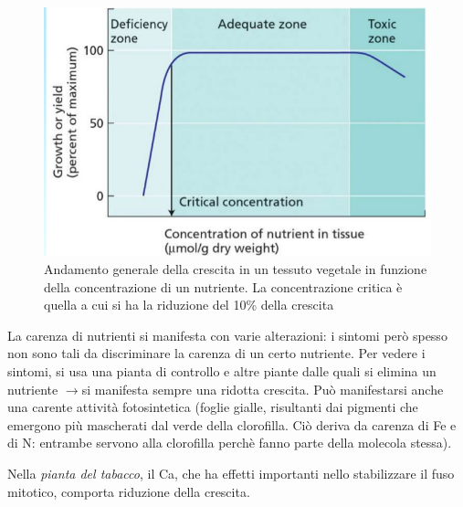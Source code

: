 \documentclass[a4paper,12pt]{book}
\newcommand{\lfreccia}{\ensuremath{\longrightarrow}}
\begin{document}
\begin{figure}[H]
\centering
\includegraphics[scale=0.3]{immagini/carenza.jpg}
\caption{Andamento generale della crescita in un tessuto vegetale in funzione della concentrazione di un nutriente. La
concentrazione critica è quella a cui si ha la riduzione del 10\% della crescita }
\end{figure}
La carenza di nutrienti si manifesta con varie alterazioni: i sintomi però spesso non sono tali da discriminare la carenza di un certo nutriente. Per vedere i sintomi, si usa una pianta di controllo e altre piante dalle quali si elimina un nutriente \lfreccia si manifesta sempre una ridotta crescita. Può manifestarsi anche una carente attività fotosintetica (foglie gialle, risultanti dai pigmenti che emergono più mascherati dal verde della clorofilla. Ciò deriva da carenza di Fe e di N: entrambe servono alla clorofilla perchè fanno parte della molecola stessa).

Nella \emph{pianta del tabacco}, il Ca, che ha effetti importanti nello stabilizzare il fuso mitotico, comporta riduzione della crescita. 
\end{document}
